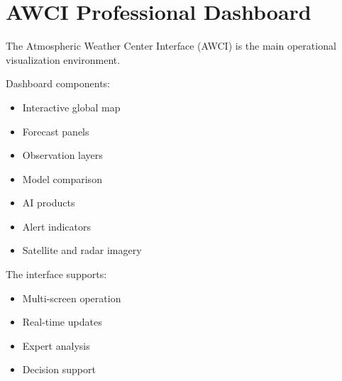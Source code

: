 \section{AWCI Professional Dashboard}


The Atmospheric Weather Center Interface (AWCI) is the main
operational visualization environment.



Dashboard components:


\begin{itemize}

\item Interactive global map

\item Forecast panels

\item Observation layers

\item Model comparison

\item AI products

\item Alert indicators

\item Satellite and radar imagery

\end{itemize}



The interface supports:


\begin{itemize}

\item Multi-screen operation

\item Real-time updates

\item Expert analysis

\item Decision support

\end{itemize}
